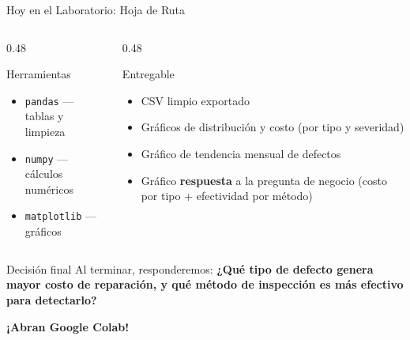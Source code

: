 \documentclass[aspectratio=169]{beamer}
\newcommand{\tech}[1]{\texttt{\textcolor{mainColor}{#1}}}
\begin{document}
\begin{frame}{Hoy en el Laboratorio: Hoja de Ruta}
  \vspace{0.25cm}
  \begin{columns}[T]
    \begin{column}{0.48\textwidth}
      \begin{conceptbox}{\faPython\enspace Herramientas}
        \small
        \begin{itemize}\setlength\itemsep{4pt}
          \item \tech{pandas} --- tablas y limpieza
          \item \tech{numpy} --- cálculos numéricos
          \item \tech{matplotlib} --- gráficos
        \end{itemize}
      \end{conceptbox}
    \end{column}
    \begin{column}{0.48\textwidth}
      \begin{conceptbox}{\faFileAlt\enspace Entregable}
        \small
        \begin{itemize}\setlength\itemsep{4pt}
          \item CSV limpio exportado
          \item Gráficos de distribución y costo (por tipo y severidad)
          \item Gráfico de tendencia mensual de defectos
          \item Gráfico \textbf{respuesta} a la pregunta de negocio (costo por tipo + efectividad por método)
        \end{itemize}
      \end{conceptbox}
    \end{column}
  \end{columns}

  \vspace{0.2cm}
  \begin{alertblock}{\faLightbulb\enspace Decisión final}
    \centering\small
    Al terminar, responderemos: \textbf{¿Qué tipo de defecto genera mayor costo de reparación, y qué método de inspección es más efectivo para detectarlo?}
  \end{alertblock}

  \vspace{0.3cm}
  \centering
  \large\textcolor{mainColor}{\faArrowRight}\enspace
  \textbf{\normalsize ¡Abran Google Colab!}
\end{frame}
\end{document}
